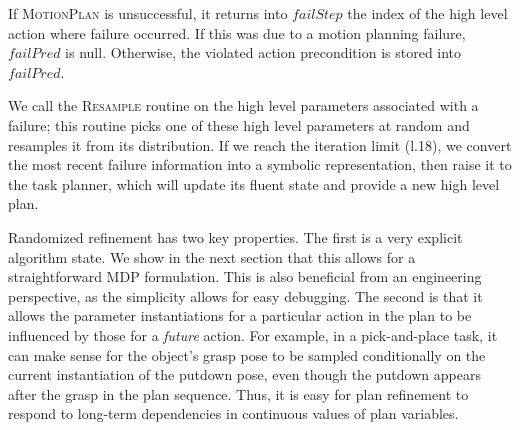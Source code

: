 If \textsc{MotionPlan} is unsuccessful, it returns into $failStep$ the index of the high level action where failure occurred.
If this was due to a motion planning failure, $failPred$ is null. Otherwise,
the violated action precondition is stored into $failPred$.

We call the \textsc{Resample} routine on the high level parameters
associated with a failure; this routine picks one of these high level parameters at random and
resamples it from its distribution. If we reach the iteration limit (l.18),
we convert the most recent failure information into a symbolic representation, then raise it
to the task planner, which will update its fluent state and provide a new
high level plan.

Randomized refinement has two key properties. The first is a very explicit algorithm state.
We show in the next section that this allows for a straightforward MDP
formulation. This is also beneficial from an
engineering perspective, as the simplicity allows for easy debugging. The second is that
it allows the parameter instantiations for a particular action in
the plan to be influenced by those for a \emph{future} action. For example, in a
pick-and-place task, it can make sense for the object's grasp pose to be sampled
conditionally on the current instantiation of the putdown pose, even though the putdown
appears after the grasp in the plan sequence. Thus, it is easy for plan refinement to
respond to long-term dependencies in continuous values of plan variables.